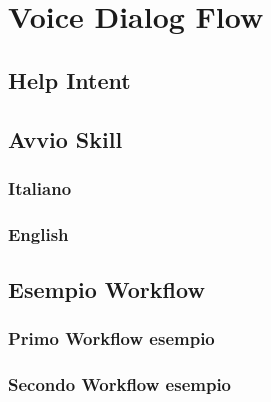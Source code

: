 \chapter{Voice Dialog Flow}

\section{Help Intent}

\section{Avvio Skill}
\subsection{Italiano}

\subsection{English}

\section{Esempio Workflow}
\subsection{Primo Workflow esempio}


\subsection{Secondo Workflow esempio}